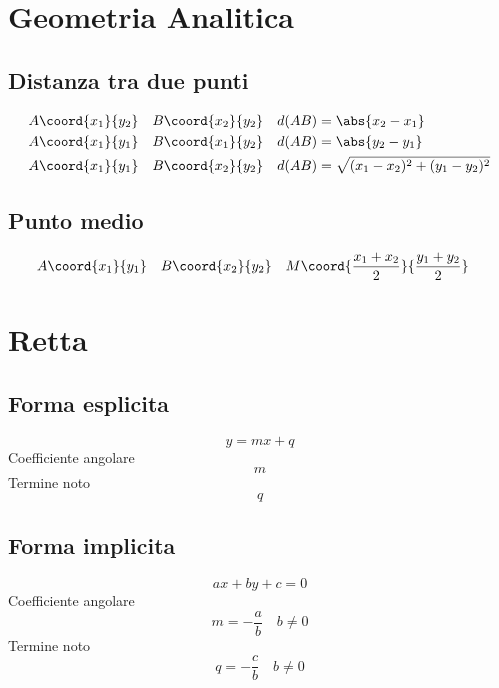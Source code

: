 \chapter{Geometria Analitica}
\section{Distanza tra due punti}
\begin{align}
A\coord{x_1}{y_2}&& B\coord{x_2}{y_2}&&&  d(AB)=\abs{x_2-x_1}\\
A\coord{x_1}{y_1} && B\coord{x_1}{y_2}&&&  d(AB)=\abs{y_2-y_1}\\
A\coord{x_1}{y_1} && B\coord{x_2}{y_2}&&&  d(AB)=\sqrt{(x_1-x_2)^2+(y_1-y_2)^2}
\end{align}
\section{Punto medio}
\begin{align}
A\coord{x_1}{y_1}&& B\coord{x_2}{y_2}&&& M\coord{\dfrac{x_1+x_2}{2}}{\dfrac{y_1+y_2}{2}}
\end{align}
\chapter{Retta}
\section{Forma esplicita}
\begin{equation}
y=mx+q
\end{equation}
Coefficiente angolare
\begin{equation}
m
\end{equation}
Termine noto
\begin{equation}
q
\end{equation}
\section{Forma implicita}
\begin{equation}
ax+by+c=0
\end{equation}
Coefficiente angolare
\begin{equation}
m=-\dfrac{a}{b}\quad b\neq 0
\end{equation}
Termine noto
\begin{equation}
q=-\dfrac{c}{b}\quad b\neq 0
\end{equation}
